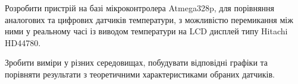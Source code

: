\TaskList
\vspace{-\topsep}

Розробити пристрій на базі мікроконтролера Atmega328p, для порівняння аналогових та цифрових датчиків температури, з можливістю перемикання між ними у реальному часі із виводом температури на LCD дисплей типу Hitachi HD44780.

Зробити виміри у різних середовищах, побудувати відповідні графіки та порівняти результати з теоретичними характеристиками обраних датчиків.

\clearpage
